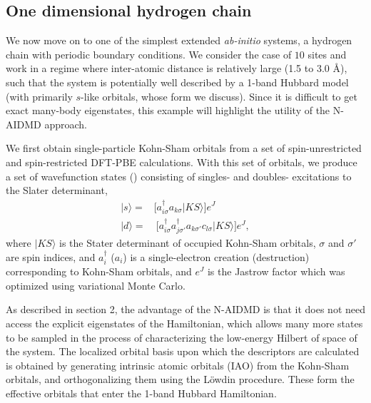 \subsection{One dimensional hydrogen chain}
We now move on to one of the simplest extended \emph{ab-initio} systems, a hydrogen chain with periodic boundary conditions. 
We consider the case of $10$ sites and work in a regime where 
inter-atomic distance is relatively large (1.5 to 3.0 \AA), 
such that the system is potentially well described by a 1-band Hubbard model (with primarily 
$s$-like orbitals, whose form we discuss). Since it is difficult to get exact many-body 
eigenstates, this example will highlight the utility of the N-AIDMD approach.

We first obtain single-particle Kohn-Sham orbitals from a set of spin-unrestricted and spin-restricted DFT-PBE calculations. 
With this set of orbitals, we produce a set of wavefunction states () 
consisting of singles- and doubles- excitations to the Slater determinant, %
\begin{subequations}
\begin{eqnarray}
| s \rangle = & \Big[a^\dagger_{i \sigma} a_{k \sigma}   | KS \rangle \Big]e^J \\
| d \rangle = & \: \Big[a^\dagger_{i \sigma} a^\dagger_{j \sigma'} a_{k \sigma'} c_{l \sigma}   | KS \rangle\Big]e^J ,
\end{eqnarray}
\end{subequations}
where $|KS\rangle$ is the Stater determinant of occupied Kohn-Sham orbitals, $\sigma$ and $\sigma'$ are spin indices, 
and $a_{i}^\dagger$ ($a_{i}$) is a single-electron creation (destruction) corresponding to Kohn-Sham orbitals, 
and $e^J$ is the Jastrow factor which was optimized using variational Monte Carlo. 

As described in section 2, the advantage of the N-AIDMD is that it does not need access the 
explicit eigenstates of the Hamiltonian, which allows many more states to be sampled in the process 
of characterizing the low-energy Hilbert of space of the system. The localized orbital basis upon which the descriptors are calculated 
is obtained by generating intrinsic atomic orbitals (IAO) from the Kohn-Sham orbitals, and orthogonalizing them using 
the L\"owdin procedure. 
These form the effective orbitals that enter the 1-band Hubbard Hamiltonian. 

